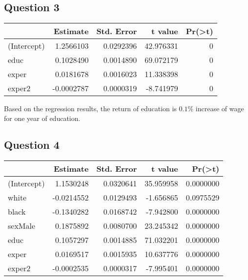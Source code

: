 \documentclass[
]{article}
\newenvironment{Shaded}{\begin{snugshade}}{\end{snugshade}}
\newcommand{\DataTypeTok}[1]{\textcolor[rgb]{0.13,0.29,0.53}{#1}}
\newcommand{\KeywordTok}[1]{\textcolor[rgb]{0.13,0.29,0.53}{\textbf{#1}}}
\newcommand{\NormalTok}[1]{#1}
\newcommand{\OperatorTok}[1]{\textcolor[rgb]{0.81,0.36,0.00}{\textbf{#1}}}
\newcommand{\StringTok}[1]{\textcolor[rgb]{0.31,0.60,0.02}{#1}}
\begin{document}
\hypertarget{question-3}{%
\subsection{Question 3}\label{question-3}}

\begin{Shaded}
\end{Shaded}

\begin{longtable}[]{@{}lrrrr@{}}
\toprule
& Estimate & Std. Error & t value &
Pr(\textgreater{}\textbar{}t\textbar{})\tabularnewline
\midrule
\endhead
(Intercept) & 1.2566103 & 0.0292396 & 42.976331 & 0\tabularnewline
educ & 0.1028490 & 0.0014890 & 69.072179 & 0\tabularnewline
exper & 0.0181678 & 0.0016023 & 11.338398 & 0\tabularnewline
exper2 & -0.0002787 & 0.0000319 & -8.741979 & 0\tabularnewline
\bottomrule
\end{longtable}

Based on the regression results, the return of education is \(0.1\%\)
increase of wage for one year of education.

\hypertarget{question-4}{%
\subsection{Question 4}\label{question-4}}

\begin{Shaded}
\end{Shaded}

\begin{longtable}[]{@{}lrrrr@{}}
\toprule
& Estimate & Std. Error & t value &
Pr(\textgreater{}\textbar{}t\textbar{})\tabularnewline
\midrule
\endhead
(Intercept) & 1.1530248 & 0.0320641 & 35.959958 &
0.0000000\tabularnewline
white & -0.0214552 & 0.0129493 & -1.656865 & 0.0975529\tabularnewline
black & -0.1340282 & 0.0168742 & -7.942800 & 0.0000000\tabularnewline
sexMale & 0.1875892 & 0.0080700 & 23.245342 & 0.0000000\tabularnewline
educ & 0.1057297 & 0.0014885 & 71.032201 & 0.0000000\tabularnewline
exper & 0.0169517 & 0.0015935 & 10.637776 & 0.0000000\tabularnewline
exper2 & -0.0002535 & 0.0000317 & -7.995401 & 0.0000000\tabularnewline
\bottomrule
\end{longtable}
\end{document}
